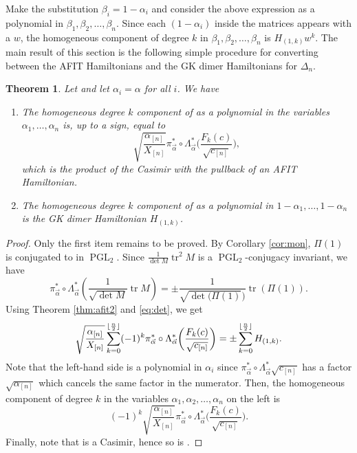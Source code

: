 \documentclass[10pt,a4paper]{amsart}
\numberwithin{equation}{section}
\newtheorem{Theorem}{Theorem}[section]
\DeclarePairedDelimiter\floor{\lfloor}{\rfloor}
\newcommand{\PGL}{\operatorname{PGL}}
\newcommand{\la}{\label}
\DeclareMathOperator{\tr}{tr}
\begin{document}
	
	Make the substitution $\beta_i=1-\alpha_i$ and consider the above expression as a polynomial in $\beta_1,\beta_2,\dots,\beta_{n}$. Since each $(1-\alpha_i)$ inside the matrices appears with a $w$, the homogeneous component of degree $k$ in $\beta_1,\beta_2,\dots,\beta_{n}$ is $H_{(1,k)} w^{k}$. The main result of this section is the following simple procedure for converting between the AFIT Hamiltonians \cite{AFIT} and the GK dimer Hamiltonians for $\Delta_n$.
	\begin{Theorem}%
		Let  and let $\alpha_i=\alpha$ for all $i$. We have
		\begin{enumerate}\itemsep=0pt
			\item[$1.$] The homogeneous degree $k$ component of  as a polynomial in the variables $\alpha_1,\dots,\alpha_n$ is, up to a sign, equal to
\[
\sqrt{ \frac{\alpha_{[n]}}{X_{[n]}}} \pi_{\vec \alpha}^* \circ \Lambda_{\vec \alpha}^*\biggl(\frac{F_k(c)}{\sqrt{c_{[n]}}}\biggr),
\]
which is the product of the Casimir  with the pullback of an AFIT Hamiltonian.
			\item[$2.$] The homogeneous degree $k$ component of  as a polynomial in $1-\alpha_1,\dots,\allowbreak{1-\alpha_n}$ is the GK dimer Hamiltonian $H_{(1,k)}$.
		\end{enumerate}
	\end{Theorem}
	
	\begin{proof}
		
		Only the first item remains to be proved. By Corollary \ref{cor:mon}, $\Pi(1)$ is conjugated to  in $\PGL_2$. Since $\frac{1}{\det M}\tr^2 M$ is a $\PGL_2$-conjugacy invariant, we have
		\[
		\pi_{\vec \alpha}^* \circ \Lambda_{\vec \alpha}^* \left(\frac{1}{\sqrt{\det M}}\tr M \right)=\pm \frac{1}{\sqrt{\det (\Pi(1)})}\tr( \Pi(1)) .
		\]
		Using Theorem \ref{thm:afit2} and \eqref{eq:det}, we get
		\[
		\sqrt{ \frac{\alpha_{[n]}}{X_{[n]}}} \sum_{k=0}^{\floor{\frac n 2}} (-1)^k \pi_{\vec \alpha}^* \circ \Lambda_{\vec \alpha}^*\biggl(\frac{F_k(c)}{\sqrt{c_{[n]}}}\biggr)=\pm \sum_{k=0}^{\floor{\frac n 2}}H_{(1,k)}.
		\]
		Note that the left-hand side is a polynomial in $\alpha_i$ since $\pi_{\vec \alpha}^* \circ \Lambda_{\vec \alpha}^*\sqrt{c_{[n]}}$ has a factor $\sqrt{\alpha_{[n]}}$ which cancels the same factor in the numerator. Then, the homogeneous component of degree $k$ in the variables $\alpha_1, \alpha_2, \dots,\alpha_{n}$ on the left is
\[
(-1)^k \sqrt{ \frac{\alpha_{[n]}}{X_{[n]}}} \pi_{\vec \alpha}^* \circ \Lambda_{\vec \alpha}^*\biggl(\frac{F_k(c)}{\sqrt{c_{[n]}}}\biggr).
\]
		Finally, note that  is a Casimir, hence so is .
	\end{proof}
	
\end{document}
